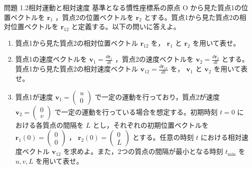 \problemstart
{}

\begin{problemBox}{問題 1.2\quad 相対運動と相対速度\hspace{1.2em}{\small\mdseries 〔基本〕}}
基準となる慣性座標系の原点 O から見た質点1の位置ベクトルを $\boldsymbol{r}_1$ ，質点2の位置ベクトルを $\boldsymbol{r}_2$ とする。質点1から見た質点2の相対位置ベクトルを $\boldsymbol{r}_{12}$ と定義する。以下の問いに答えよ。

\begin{enumerate}
  \item 質点1から見た質点2の相対位置ベクトル $\boldsymbol{r}_{12}$ を， $\boldsymbol{r}_1$ と $\boldsymbol{r}_2$ を用いて表せ。

  \item 質点1の速度ベクトルを $\boldsymbol{v}_1 = \frac{d\boldsymbol{r}_1}{dt}$ ，質点2の速度ベクトルを $\boldsymbol{v}_2 = \frac{d\boldsymbol{r}_2}{dt}$ とする。質点1から見た質点2の相対速度ベクトル $\boldsymbol{v}_{12} = \frac{d\boldsymbol{r}_{12}}{dt}$ を， $\boldsymbol{v}_1$ と $\boldsymbol{v}_2$ を用いて表せ。

  \item 質点1が速度 $\boldsymbol{v}_1 = \begin{pmatrix} u \\ 0 \end{pmatrix}$ で一定の運動を行っており，質点2が速度 $\boldsymbol{v}_2 = \begin{pmatrix} 0 \\ v \end{pmatrix}$ で一定の運動を行っている場合を想定する。初期時刻 $t=0$ における各質点の間隔を $L$ とし，それぞれの初期位置ベクトルを $\boldsymbol{r}_1(0) = \begin{pmatrix} 0 \\ 0 \end{pmatrix}$ ， $\boldsymbol{r}_2(0) = \begin{pmatrix} 0 \\ L \end{pmatrix}$ とする。任意の時刻 $t$ における相対速度ベクトル $\boldsymbol{v}_{12}$ を求めよ。また，2つの質点の間隔が最小となる時刻 $t_{\text{min}}$ を $u, v, L$ を用いて表せ。
\end{enumerate}
\end{problemBox}

